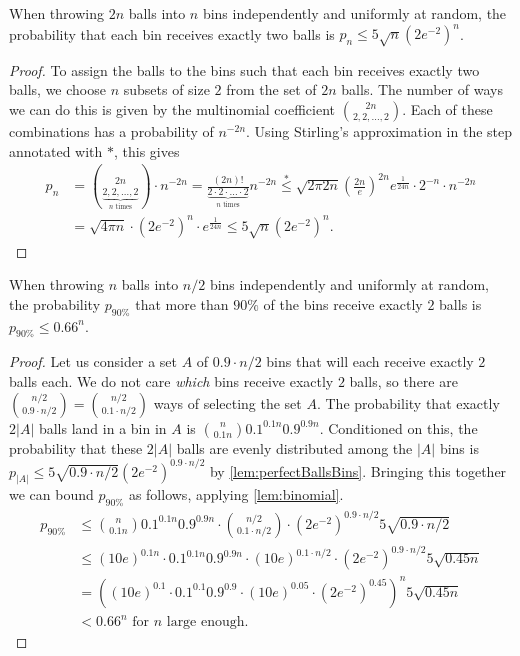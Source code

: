 \documentclass[a4paper,USenglish,cleveref]{lipics-v2021}
\begin{document}
\begin{lemma}
  When throwing $2n$ balls into $n$ bins independently and uniformly at random, the probability that each bin receives exactly two balls is $p_n \leq 5 \sqrt{n}(2e^{-2})^n$.
  \label{lem:perfectBallsBins}
\end{lemma}
\begin{proof}
  To assign the balls to the bins such that each bin receives exactly two balls, we choose $n$ subsets of size $2$ from the set of $2n$ balls.
  The number of ways we can do this is given by the multinomial coefficient ${2n \choose {2,2,\ldots,2}}$.
  Each of these combinations has a probability of $n^{-2n}$.
  Using Stirling's approximation in the step annotated with $*$, this gives
  \begin{align*}
    p_n
      &= {2n \choose \underbrace{2,2,\ldots,2}_\textrm{$n$ times}} \cdot n^{-2n}
       = \frac{(2n)!}{\underbrace{2 \cdot 2 \cdot \ldots \cdot 2}_\textrm{$n$ times}}n^{-2n}
       \overset{*}{\leq} \sqrt{2\pi 2n}\left(\frac{2n}{e}\right)^{2n}e^{\frac{1}{24n}}\cdot 2^{-n} \cdot n^{-2n}\\
      &=\sqrt{4\pi n} \cdot (2e^{-2})^n \cdot e^{\frac{1}{24n}}
      \leq 5 \sqrt{n}(2e^{-2})^n.
    \tag*{\qedhere}
  \end{align*}
\end{proof}

\begin{lemma}
  When throwing $n$ balls into $n/2$ bins independently and uniformly at random, the probability $p_{90\%}$ that more than $90\%$ of the bins receive exactly $2$ balls is $p_{90\%} \leq 0.66^n$.
  \label{lem:nodeDegree2}
\end{lemma}
\begin{proof}
  Let us consider a set $A$ of $0.9 \cdot n/2$ bins that will each receive exactly $2$ balls each.
  We do not care \emph{which} bins receive exactly $2$ balls, so there are ${n/2 \choose 0.9 \cdot n/2} = {n/2 \choose 0.1 \cdot n/2}$ ways of selecting the set $A$.
  The probability that exactly $2|A|$ balls land in a bin in $A$ is ${n \choose 0.1n} 0.1^{0.1n} 0.9^{0.9n}$.
  Conditioned on this, the probability that these $2|A|$ balls are evenly distributed among the $|A|$ bins is $p_{|A|} \leq 5 \sqrt{0.9 \cdot n/2} \left(2e^{-2}\right)^{0.9 \cdot n/2}$ by \cref{lem:perfectBallsBins}.
  Bringing this together we can bound $p_{90\%}$ as follows, applying \cref{lem:binomial}.
  \begin{align*}
    p_{90\%}
      &\leq {n \choose 0.1n} 0.1^{0.1n} 0.9^{0.9n} \cdot {n/2 \choose 0.1 \cdot n/2} \cdot \left(2e^{-2}\right)^{0.9 \cdot n/2} 5 \sqrt{0.9 \cdot n/2} \\
      &\leq (10e)^{0.1n} \cdot 0.1^{0.1n} 0.9^{0.9n} \cdot (10e)^{0.1\cdot n/2} \cdot \left(2e^{-2}\right)^{0.9 \cdot n/2} 5 \sqrt{0.45n}  \\
      &= \left((10e)^{0.1} \cdot 0.1^{0.1} 0.9^{0.9} \cdot (10e)^{0.05} \cdot \left(2e^{-2}\right)^{0.45} \right)^{n} 5 \sqrt{0.45n}\\
      &< 0.66^{n} \textrm{ for $n$ large enough.}
    \tag*{\qedhere}
  \end{align*}
\end{proof}
\end{document}
